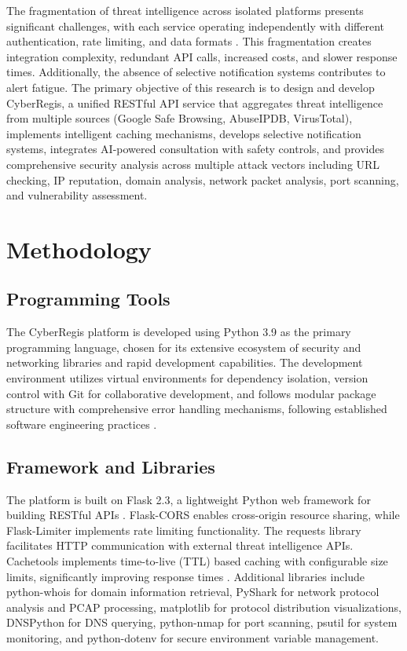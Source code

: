 \documentclass[pdflatex,sn-mathphys-num]{sn-jnl}%
\theoremstyle{thmstyleone}%
\theoremstyle{thmstyletwo}%
\theoremstyle{thmstylethree}%
\begin{document}
The fragmentation of threat intelligence across isolated platforms presents significant challenges, with each service operating independently with different authentication, rate limiting, and data formats \cite{bib1}. This fragmentation creates integration complexity, redundant API calls, increased costs, and slower response times. Additionally, the absence of selective notification systems contributes to alert fatigue. The primary objective of this research is to design and develop CyberRegis, a unified RESTful API service that aggregates threat intelligence from multiple sources (Google Safe Browsing, AbuseIPDB, VirusTotal), implements intelligent caching mechanisms, develops selective notification systems, integrates AI-powered consultation with safety controls, and provides comprehensive security analysis across multiple attack vectors including URL checking, IP reputation, domain analysis, network packet analysis, port scanning, and vulnerability assessment.

\section{Methodology}\label{sec3}

\subsection{Programming Tools}

The CyberRegis platform is developed using Python 3.9 as the primary programming language, chosen for its extensive ecosystem of security and networking libraries and rapid development capabilities. The development environment utilizes virtual environments for dependency isolation, version control with Git for collaborative development, and follows modular package structure with comprehensive error handling mechanisms, following established software engineering practices \cite{bib20}.

\subsection{Framework and Libraries}

The platform is built on Flask 2.3, a lightweight Python web framework for building RESTful APIs \cite{bib7}. Flask-CORS enables cross-origin resource sharing, while Flask-Limiter implements rate limiting functionality. The requests library facilitates HTTP communication with external threat intelligence APIs. Cachetools implements time-to-live (TTL) based caching with configurable size limits, significantly improving response times \cite{bib19}. Additional libraries include python-whois for domain information retrieval, PyShark for network protocol analysis and PCAP processing, matplotlib for protocol distribution visualizations, DNSPython for DNS querying, python-nmap for port scanning, psutil for system monitoring, and python-dotenv for secure environment variable management.
\end{document}
